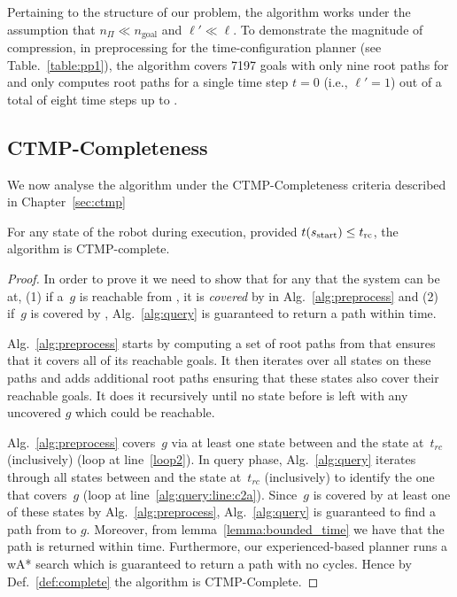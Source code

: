 \documentclass[a4paper]{report}
\begin{document}
Pertaining to the structure of our problem, the algorithm works under the assumption that $n_\Pi \ll n_{\text{goal}}$ and $\ell' \ll \ell$.  To demonstrate the magnitude of compression, in preprocessing for the time-configuration planner (see Table.~\ref{table:pp1}), the algorithm covers 7197 goals with only nine root paths for \Shome and only computes root paths for a single time step $t = 0$ (i.e., $\ell' = 1$) out of a total of eight time steps up to \Trc. 


\subsection{CTMP-Completeness}
We now analyse the algorithm under the CTMP-Completeness criteria described in Chapter~\ref{sec:ctmp}
\vspace{2mm}
\begin{theorem}
For any state \Sstart of the robot during execution, provided $t(s_{\textrm{start}}) \leq t_{\textrm{rc}}$, the algorithm is CTMP-complete.
\end{theorem}

\begin{proof}[Proof]
In order to prove it we need to show that for any \Sstart that the system can be at, (1) if a~$g$ is reachable from \Sstart, it is \emph{covered} by \Sstart in Alg.~\ref{alg:preprocess} and (2) if~$g$ is covered by \Sstart, Alg.~\ref{alg:query} is guaranteed to return a path within \Tbound time.

Alg.~\ref{alg:preprocess} starts by computing a set of root paths from \Shome that ensures that it covers all of its reachable goals. It then iterates over all states on these paths and adds additional root paths ensuring that these states also cover their reachable goals. It does it recursively until no state \Sstart before \Trc is left with any uncovered $g$ which could be reachable.
    
Alg.~\ref{alg:preprocess} covers~$g$ via at least one state between \Sstart and the state at~$t_{rc}$ (inclusively) (loop at line~\ref{loop2}).
In query phase, Alg.~\ref{alg:query} iterates through all states between \Sstart and the state at~$t_{rc}$ (inclusively) to identify the one that covers~$g$ (loop at line~\ref{alg:query:line:c2a}). Since~$g$ is covered by at least one of these states by Alg.~\ref{alg:preprocess}, Alg.~\ref{alg:query} is guaranteed to find a path from \Sstart to $g$.
%
Moreover, from lemma~\ref{lemma:bounded_time} we have that the path is returned within \Tbound time.
%
Furthermore, our experienced-based planner runs a wA* search which is guaranteed to return a path with no cycles. Hence by Def.~\ref{def:complete} the algorithm is CTMP-Complete.
\end{proof}
\end{document}
